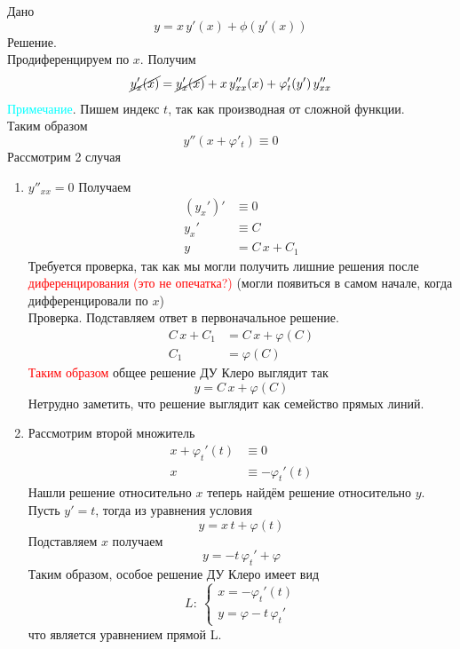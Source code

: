 \begin{Note}
    Дано
    \[
        y = x\,y'(x) + \phi(y'(x))
    \]
    Решение.\\
    Продиференцируем по $x$. Получим
    \[
        \cancel{y'_x(x)} = \cancel{y'_x(x)} + x\,y''_{xx}(x) + \varphi'_t(y')\,y''_{xx}
    \]
    \textcolor{cyan}{Примечание}. Пишем индекс $t$, так как производная от сложной функции.\\
    Таким образом
    \[
        y''(x + \varphi'_t) \equiv 0
    \]
    Рассмотрим 2 случая
    \begin{enumerate}
        \item  $y''_{xx}=0$ Получаем\\
        \begin{align*}
            (y_x')'&\equiv0\\
            y_x' &\equiv C\\
            y&=C\,x + C_1
        \end{align*}
        Требуется проверка, так как мы могли получить лишние решения после \textcolor{red}{диференцирования (это не опечатка?)} (могли появиться в самом начале, когда дифференцировали по $x$)\\
        Проверка. Подставляем ответ в первоначальное решение.\\
        \begin{align*}
            C\,x + C_1 &= C\,x + \varphi(C)\\
            C_1 &= \varphi(C)
        \end{align*}
        \textcolor{red}{Таким образом} общее решение ДУ Клеро выглядит так
        \[
            y = C\,x + \varphi(C)     
        \]
        Нетрудно заметить, что решение выглядит как семейство прямых линий.
                
        \item Рассмотрим второй множитель
        \begin{align*}
            x + \varphi_t'(t) &\equiv 0\\
            x &\equiv - \varphi_t'(t)
        \end{align*}
        Нашли решение относительно $x$ теперь найдём решение относительно $y$.\\
        Пусть $y' = t$, тогда из уравнения условия
        \[
            y = x\,t + \varphi(t)
        \]
        Подставляем $x$ получаем
        \[
            y = -t\,\varphi_t' + \varphi
        \]
        Таким образом, особое решение ДУ Клеро имеет вид
        \[
           L :\: \begin{cases}
                x = - \varphi_t'(t)\\
                y = \varphi - t\,\varphi_t'
            \end{cases}
        \]
        что является уравнением прямой L.
    \end{enumerate}
    \pagebreak


\end{Note}
